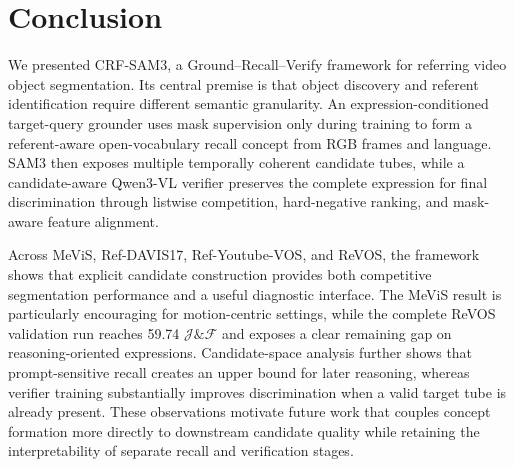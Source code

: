 \section{Conclusion}
We presented CRF-SAM3, a Ground--Recall--Verify framework for referring video object segmentation. Its central premise is that object discovery and referent identification require different semantic granularity. An expression-conditioned target-query grounder uses mask supervision only during training to form a referent-aware open-vocabulary recall concept from RGB frames and language. SAM3 then exposes multiple temporally coherent candidate tubes, while a candidate-aware Qwen3-VL verifier preserves the complete expression for final discrimination through listwise competition, hard-negative ranking, and mask-aware feature alignment.

Across MeViS, Ref-DAVIS17, Ref-Youtube-VOS, and ReVOS, the framework shows that explicit candidate construction provides both competitive segmentation performance and a useful diagnostic interface. The MeViS result is particularly encouraging for motion-centric settings, while the complete ReVOS validation run reaches 59.74 $\mathcal{J}\&\mathcal{F}$ and exposes a clear remaining gap on reasoning-oriented expressions. Candidate-space analysis further shows that prompt-sensitive recall creates an upper bound for later reasoning, whereas verifier training substantially improves discrimination when a valid target tube is already present. These observations motivate future work that couples concept formation more directly to downstream candidate quality while retaining the interpretability of separate recall and verification stages.
